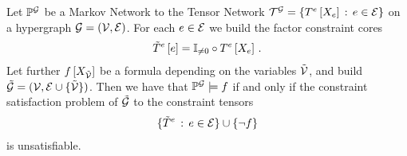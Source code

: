 \begin{theorem}\label{the:factorReduction}
	Let $\mathbb{P}^{\mathcal{G}}$ be a Markov Network to the Tensor Network $\mathcal{T}^{\mathcal{G}}=\{T^{e}\left[X_{e}\right]\, : \, e\in\mathcal{E}\}$ on a hypergraph $\mathcal{G}=(\mathcal{V},\mathcal{E})$. %
	For each $e\in\mathcal{E}$ we build the factor constraint cores
	\begin{align*}
		\tilde{T}^{e}\left[e\right] = \mathbb{I}_{\neq0}\circ T^{e}\left[X_{e}\right] \, .
	\end{align*}
	Let further $f\left[X_{\tilde{\mathcal{V}}}\right]$ be a formula depending on the variables $\tilde{\mathcal{V}}$, and build $\tilde{\mathcal{G}}=(\mathcal{V},\mathcal{E}\cup\{\tilde{\mathcal{V}}\})$.
	Then we have that $\mathbb{P}^{\mathcal{G}}\models f$ if and only if the constraint satisfaction problem of $\tilde{\mathcal{G}}$ to the constraint tensors
	\begin{align*}
		\{\tilde{T}^{e} \, : \, e\in\mathcal{E} \} \cup \{\lnot f \}
	\end{align*}
	is unsatisfiable.
\end{theorem}
